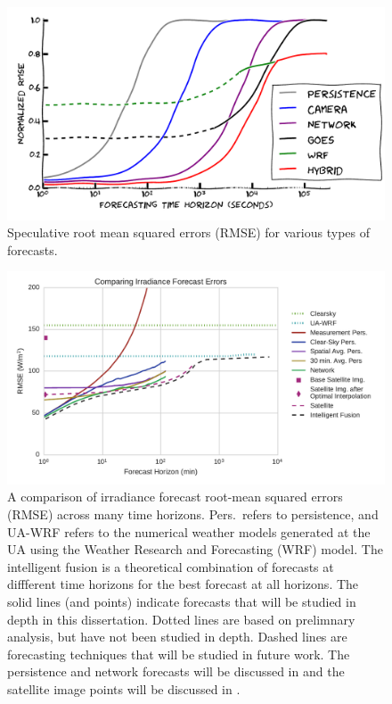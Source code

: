 \begin{figure}[tbp]
\includegraphics[width=\textwidth]{figs/bullshit.pdf}
\caption[Speculative errors for various forecasting
techniques]{Speculative root mean squared errors (RMSE) for various
  types of forecasts.}
\label{fig:bullshitplot}
\end{figure}

\begin{figure}[tbp]
\includegraphics[width=\textwidth]{figs/timehorizon.pdf}
\caption[Irradiance forecast errors across forecast horizons]{A
  comparison of irradiance forecast root-mean squared errors (RMSE)
  across many time horizons.  Pers.\ refers to persistence, and UA-WRF
  refers to the numerical weather models generated at the UA using the
  Weather Research and Forecasting (WRF) model. The intelligent fusion
  is a theoretical combination of forecasts at diffferent time
  horizons for the best forecast at all horizons.  The solid lines
  (and points) indicate forecasts that will be studied in depth in
  this dissertation. Dotted lines are based on prelimnary analysis,
  but have not been studied in depth.  Dashed lines are forecasting
  techniques that will be studied in future work.  The persistence and
  network forecasts will be discussed in  and the
  satellite image points will be discussed in .}
\label{fig:newshitplot}
\end{figure}

